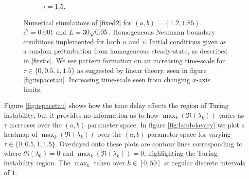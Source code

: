 \begin{figure}[H]
\begin{subfigure}[b]{0.45\textwidth}
        \caption{$\tau=1.5$.}
        \label{}
    \end{subfigure}
    \caption{Numerical simulations of \eqref{fixed2} for $(a,b)=(1.2,1.85)$. $\epsilon^2=0.001$ and $L=30\sqrt{0.05}$. Homogeneous Neumann boundary conditions implemented for both $u$ and $v$. Initial conditions given as a random perturbation from homogeneous steady-state, as described in \eqref{firstic}. We see pattern formation on an increasing time-scale for $\tau\in\{0,0.5,1,1.5\}$ as suggested by linear theory, seen in figure \ref{fig:tspacetau}. Increasing time-scale seen from changing $x$-axis limits.}
    \label{fig:testturing3}
\end{figure}

Figure \ref{fig:tspacetau} shows how the time delay affects the region of Turing instability, but it provides no information as to how $\max_k(\Re(\lambda_k))$ varies as $\tau$ increases over the $(a,b)$ parameter space. In figure \ref{fig:lambdavary} we plot a heatmap of $\max_k(\Re(\lambda_k))$ over the $(a,b)$ parameter space for varying $\tau\in\{0,0.5,1,1.5\}$. Overlayed onto these plots are contour lines corresponding to where $\Re(\lambda_0)=0$ and $\max_k(\Re(\lambda_k))=0$,
highlighting the Turing instability region. The $\max_k$ taken over $k\in[0,50]$ at regular discrete intervals of $1$.
